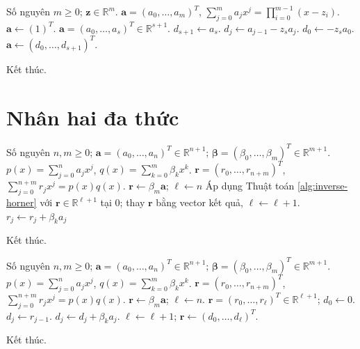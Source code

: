 \documentclass[12pt,a4paper,oneside]{book}
\numberwithin{algorithm}{chapter}
\theoremstyle{definition}
\newcommand{\R}{\mathbb{R}}
\begin{document}
\begin{algorithm}[H]
\caption{Tạo đa thức tích bằng Horner ngược -- chi tiết}
\label{alg:horner-product-detailed}
\begin{algorithmic}[1]
\Require Số nguyên $m\geq0$; $\boldsymbol z\in\R^m$.
\Ensure $\boldsymbol a=(a_0,\ldots,a_m)^T$, $\sum_{j=0}^{m}a_jx^j=\prod_{i=0}^{m-1}(x-z_i)$.
\State $\boldsymbol a\gets(1)^T$.
  \State $\boldsymbol a=(a_0,\ldots,a_s)^T\in\R^{s+1}$.
  \State $d_{s+1}\gets a_s$.
    \State $d_j\gets a_{j-1}-z_sa_j$.
  \EndFor
\Statex
  \State $d_0\gets-z_sa_0$.
  \State $\boldsymbol a\gets(d_0,\ldots,d_{s+1})^T$.
\EndFor
\Statex

\State Kết thúc.
\end{algorithmic}
\end{algorithm}

\section{Nhân hai đa thức}
\begin{algorithm}[H]
\caption{Nhân hai đa thức bằng Horner -- sơ lược}
\label{alg:polynomial-horner-mul}
\begin{algorithmic}[1]
\Require Số nguyên $n,m\geq0$; $\boldsymbol a=(a_0,\ldots,a_n)^T\in\R^{n+1}$; $\boldsymbol\beta=(\beta_0,\ldots,\beta_m)^T\in\R^{m+1}$. $p(x)=\sum_{j=0}^{n}a_jx^j$, $q(x)=\sum_{k=0}^{m}\beta_kx^k$.
\Ensure $\boldsymbol r=(r_0,\ldots,r_{n+m})^T$, $\sum_{j=0}^{n+m}r_jx^j=p(x)q(x)$.
\State $\boldsymbol r\gets\beta_m\boldsymbol a$; $\ell\gets n$
  \State Áp dụng Thuật toán \ref{alg:inverse-horner} với $\boldsymbol r\in\R^{\ell+1}$ tại $0$; thay $\boldsymbol r$ bằng vector kết quả, $\ell\gets\ell+1$.
    \State $r_j\gets r_j+\beta_ka_j$
  \EndFor
\EndFor
\Statex

\State Kết thúc.
\end{algorithmic}
\end{algorithm}

\begin{algorithm}[H]
\caption{Nhân hai đa thức bằng Horner -- chi tiết}
\label{alg:polynomial-horner-mul-detailed}
\begin{algorithmic}[1]
\Require Số nguyên $n,m\geq0$; $\boldsymbol a=(a_0,\ldots,a_n)^T\in\R^{n+1}$; $\boldsymbol\beta=(\beta_0,\ldots,\beta_m)^T\in\R^{m+1}$. $p(x)=\sum_{j=0}^{n}a_jx^j$, $q(x)=\sum_{k=0}^{m}\beta_kx^k$.
\Ensure $\boldsymbol r=(r_0,\ldots,r_{n+m})^T$, $\sum_{j=0}^{n+m}r_jx^j=p(x)q(x)$.
\State $\boldsymbol r\gets\beta_m\boldsymbol a$; $\ell\gets n$.
  \State $\boldsymbol r=(r_0,\ldots,r_\ell)^T\in\R^{\ell+1}$; $d_0\gets0$.
    \State $d_j\gets r_{j-1}$.
  \EndFor
\Statex
    \State $d_j\gets d_j+\beta_ka_j$.
  \EndFor
\Statex
  \State $\ell\gets\ell+1$; $\boldsymbol r\gets(d_0,\ldots,d_\ell)^T$.
\EndFor
\Statex

\State Kết thúc.
\end{algorithmic}
\end{algorithm}
\end{document}

